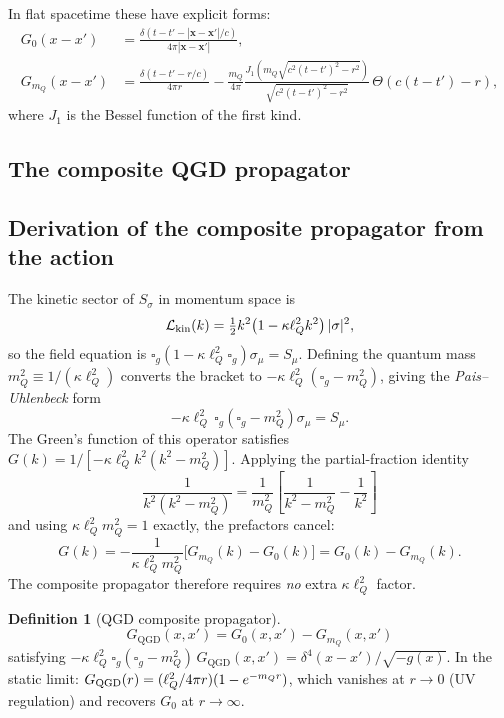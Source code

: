 \documentclass[11pt,a4paper]{article}
\theoremstyle{plain}
\theoremstyle{definition}
\newtheorem{definition}[theorem]{Definition}
\theoremstyle{remark}
\newcommand{\lQ}{\ell_Q}
\newcommand{\mQ}{m_Q}
\newcommand{\boxg}{\square_g}
\begin{document}
In flat spacetime these have explicit forms:
\begin{align}
  G_0(x-x') &= \frac{\delta(t-t'-|\mathbf{x}-\mathbf{x}'|/c)}{4\pi|\mathbf{x}-\mathbf{x}'|},
    \label{eq:G0flat}\\
  G_{\mQ}(x-x') &= \frac{\delta(t-t'-r/c)}{4\pi r}
    - \frac{\mQ}{4\pi}\frac{J_1\!\left(\mQ\sqrt{c^2(t-t')^2-r^2}\right)}
          {\sqrt{c^2(t-t')^2-r^2}}\,\Theta(c(t-t')-r),
    \label{eq:GmQflat}
\end{align}
where $J_1$ is the Bessel function of the first kind.

\subsection{The composite QGD propagator}

\subsection{Derivation of the composite propagator from the action}

The kinetic sector of $S_\sigma$ in momentum space is
\[
  \mathcal{L}_{\rm kin}(k) = \tfrac{1}{2}k^2\!\left(1 - \kappa\lQ^2 k^2\right)|\sigma|^2,
\]
so the field equation is $\boxg(1-\kappa\lQ^2\boxg)\sigma_\mu = S_\mu$.
Defining the quantum mass $\mQ^2 \equiv 1/(\kappa\lQ^2)$ converts the bracket to
$-\kappa\lQ^2(\boxg-\mQ^2)$, giving the \emph{Pais--Uhlenbeck} form
\begin{equation}
  -\kappa\lQ^2\,\boxg\!\left(\boxg - \mQ^2\right)\sigma_\mu = S_\mu.
  \label{eq:PU}
\end{equation}
The Green's function of this operator satisfies $G(k) = 1/[-\kappa\lQ^2 k^2(k^2-\mQ^2)]$.
Applying the partial-fraction identity
\[
  \frac{1}{k^2(k^2-\mQ^2)} = \frac{1}{\mQ^2}\!\left[\frac{1}{k^2-\mQ^2}-\frac{1}{k^2}\right]
\]
and using $\kappa\lQ^2\mQ^2 = 1$ exactly, the prefactors cancel:
\[
  G(k) = -\frac{1}{\kappa\lQ^2\mQ^2}\bigl[G_{\mQ}(k)-G_0(k)\bigr]
        = G_0(k) - G_{\mQ}(k).
\]
The composite propagator therefore requires \emph{no} extra $\kappa\lQ^2$ factor.

\begin{definition}[QGD composite propagator]
\begin{equation}
  G_{\mathrm{QGD}}(x,x') = G_0(x,x') - G_{\mQ}(x,x')
  \label{eq:GQGD}
\end{equation}
satisfying $-\kappa\lQ^2\boxg(\boxg-\mQ^2)\,G_{\mathrm{QGD}}(x,x') = \delta^4(x-x')/\sqrt{-g(x)}$.
In the static limit: $G_{\rm QGD}(r) = (\ell_Q^2/4\pi r)(1-e^{-\mQ r})$,
which vanishes at $r\to 0$ (UV regulation) and recovers $G_0$ at $r\to\infty$.
\end{definition}
\end{document}
